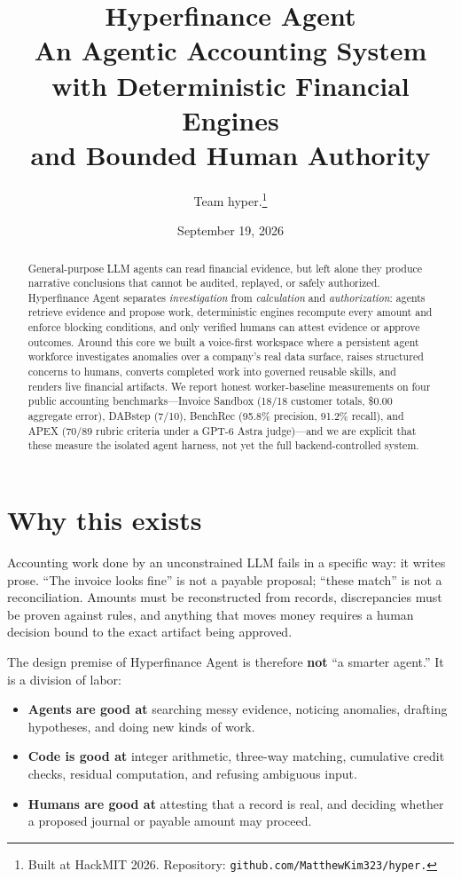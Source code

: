 \documentclass[11pt]{article}
\title{\vspace{-1.5em}\textbf{Hyperfinance Agent}\\[0.2em]\large An Agentic Accounting System with Deterministic Financial Engines\\ and Bounded Human Authority}
\author{Team hyper.\thanks{Built at HackMIT 2026. Repository: \texttt{github.com/MatthewKim323/hyper.}}}
\date{September 19, 2026}
\begin{document}
\maketitle
\vspace{-1em}

\begin{abstract}
\noindent General-purpose LLM agents can read financial evidence, but left alone they produce narrative conclusions that cannot be audited, replayed, or safely authorized. Hyperfinance Agent separates \emph{investigation} from \emph{calculation} and \emph{authorization}: agents retrieve evidence and propose work, deterministic engines recompute every amount and enforce blocking conditions, and only verified humans can attest evidence or approve outcomes. Around this core we built a voice-first workspace where a persistent agent workforce investigates anomalies over a company's real data surface, raises structured concerns to humans, converts completed work into governed reusable skills, and renders live financial artifacts. We report honest worker-baseline measurements on four public accounting benchmarks---Invoice Sandbox (18/18 customer totals, \$0.00 aggregate error), DABstep (7/10), BenchRec (95.8\% precision, 91.2\% recall), and APEX (70/89 rubric criteria under a GPT-6 Astra judge)---and we are explicit that these measure the isolated agent harness, not yet the full backend-controlled system.
\end{abstract}

\section{Why this exists}

Accounting work done by an unconstrained LLM fails in a specific way: it writes prose. ``The invoice looks fine'' is not a payable proposal; ``these match'' is not a reconciliation. Amounts must be reconstructed from records, discrepancies must be proven against rules, and anything that moves money requires a human decision bound to the exact artifact being approved.

The design premise of Hyperfinance Agent is therefore \textbf{not} ``a smarter agent.'' It is a division of labor:

\begin{itemize}
\item \textbf{Agents are good at} searching messy evidence, noticing anomalies, drafting hypotheses, and doing new kinds of work.
\item \textbf{Code is good at} integer arithmetic, three-way matching, cumulative credit checks, residual computation, and refusing ambiguous input.
\item \textbf{Humans are good at} attesting that a record is real, and deciding whether a proposed journal or payable amount may proceed.
\end{itemize}
\end{document}
